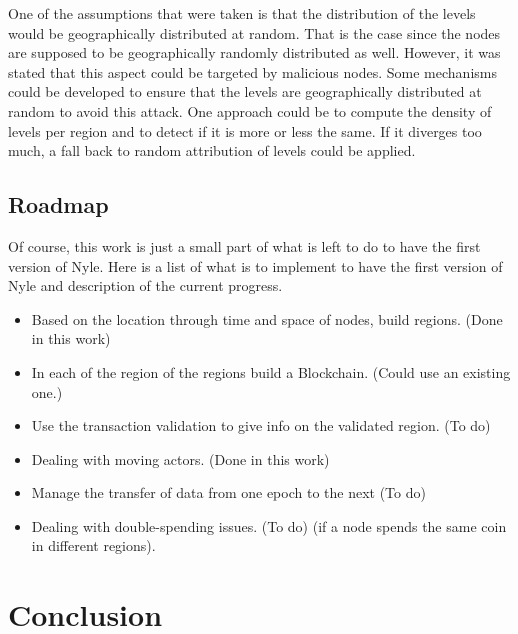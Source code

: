 \documentclass[a4paper,11pt,twoside,openright]{report}
\begin{document}
One of the assumptions that were taken is that the distribution of the levels
would be geographically distributed at random. That is the case since the
nodes are supposed to be geographically randomly distributed as well.
However, it was stated that this aspect could be targeted by malicious nodes.
 Some mechanisms could be developed to ensure
that the levels are geographically distributed at random to avoid this attack. One approach could be
to compute the density of levels per region and to detect if it is more or less
the same. If it diverges too much, a fall back to random attribution of levels
could be applied. 

\section{Roadmap}
Of course, this work is just a small part of what is left to do to have the first
version of Nyle. Here is a list of what is to implement to have the first version
of Nyle and description of the current progress.

\begin{itemize} 
\item Based on the location through time and space of nodes, build regions.
(Done in this work)
\item In each of the region of the regions build a Blockchain. (Could use an
 existing one.)
\item Use the transaction validation to give info on the validated region. (To
do) 
\item Dealing with moving actors. (Done in this work)
\item Manage the transfer of data from one epoch to the next (To do)
\item Dealing with double-spending issues. (To do)
(if a node spends the same coin in different regions). 
\end{itemize}

\chapter{Conclusion} \label{chap:Conclusion} %

\end{document}

